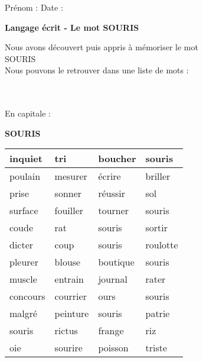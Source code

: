 \documentclass[a4paper, 12pt,oneside, fleqn]{article}
\begin{document}
\newcommand{\x}{\times}
\renewcommand{\arraystretch}{1.5}

\sloppy
\pagestyle{empty}
\begin{onehalfspace}


\sffamily \noindent \Large Pr\'enom : \fbox{\begin{minipage}{9cm} \vspace{1.2cm}\hspace{9cm} \end{minipage}} \hspace{1.5cm}\Large Date :\vspace{2mm}\\
\begin{minipage}{12cm}
\begin{center}
\Large\textbf{Langage \'ecrit - Le mot \MakeUppercase{souris}}
\end{center}
\normalsize Nous avons d\'ecouvert puis appris \`a m\'emoriser le mot\\
\MakeUppercase{souris}\\
Nous pouvons le retrouver dans une liste de mots : \end{minipage}\\
\vspace{0.25cm}\\
 
\large\noindent En capitale :
\begin{center}
{\Huge \textbf{\MakeUppercase{souris}}}
\vspace{1cm}\\
\begin{tabulary}{19.5cm}{|g|g|g|g|}
\hline
inquiet & tri & boucher & souris\\
\hline
poulain & mesurer & écrire & briller \\
\hline
prise & sonner & réussir & sol\\
\hline
surface & fouiller & tourner & souris \\
\hline
coude & rat & souris & sortir\\
\hline
dicter & coup & souris & roulotte\\
\hline
pleurer & blouse & boutique & souris\\
\hline
muscle & entrain & journal & rater\\
\hline
concours & courrier & ours & souris\\
\hline
malgré & peinture & souris & patrie \\
\hline
souris & rictus & frange & riz\\
\hline
oie & sourire & poisson & triste\\
\hline
\end{tabulary}
\end{center}
\vspace{0.5cm}

\end{onehalfspace}
\end{document}
